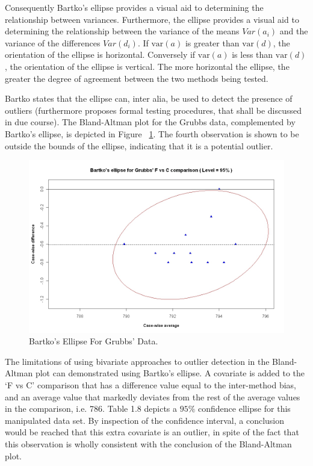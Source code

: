 \documentclass[Main.tex]{subfiles}
\begin{document}
	
	Consequently Bartko's ellipse provides a visual aid to determining the
	relationship between variances. 
	Furthermore, the ellipse provides a visual aid to determining the relationship
	between the variance of the means $Var(a_{i})$ and the variance of the differences $Var(d_{i})$. If $\mbox{var}(a)$ is greater than $\mbox{var}(d)$, the orientation of the ellipse is horizontal. Conversely if $\mbox{var}(a)$ is less than $\mbox{var}(d)$, the orientation of the ellipse is vertical. The more horizontal the ellipse, the greater the degree of agreement between the two methods being tested.
	
	
	Bartko states that the ellipse can, inter alia, be used to detect the presence of outliers (furthermore
	\citet{Bartko} proposes formal testing procedures, that shall be discussed in due course). 
	The Bland-Altman plot for the Grubbs data, complemented by Bartko's ellipse, is depicted in Figure ~\ref{GrubbsBartko1}.
	The fourth observation is shown to be outside the bounds of the ellipse, indicating that it is a potential outlier.
	
	
	\begin{centering}
		\begin{figure}[h!]
			\includegraphics[width=130mm]{images/GrubbsBartko.jpeg}
			\caption{Bartko's Ellipse For Grubbs' Data.}
			\label{GrubbsBartko1}
		\end{figure}
	\end{centering}
	
	The limitations of using bivariate approaches to outlier detection
	in the Bland-Altman plot can demonstrated using Bartko's ellipse.
	A covariate is added to the `F vs C' comparison that has a
	difference value equal to the inter-method bias, and an average
	value that markedly deviates from the rest of the average values
	in the comparison, i.e. 786. Table 1.8 depicts a $95\%$ confidence
	ellipse for this manipulated data set. By inspection of the
	confidence interval, a conclusion would be reached that this extra
	covariate is an outlier, in spite of the fact that this
	observation is wholly consistent with the conclusion of the
	Bland-Altman plot.
	
\end{document}
